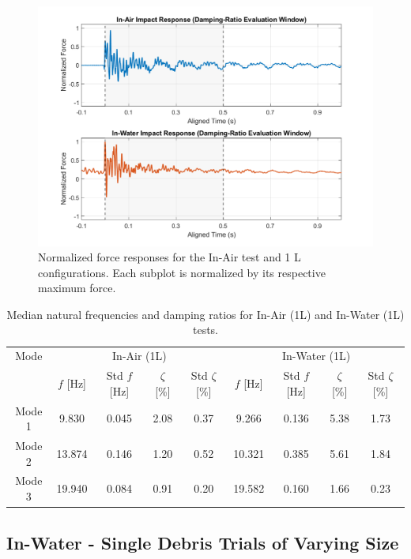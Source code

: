 \documentclass{article}
\begin{document}
{\begin{figure}[ht]
    \centering
    \includegraphics[width=\linewidth]{figures/plot_normalized_forces_in_air_vs_in_water_overlay.png}
    \caption{Normalized force responses for the In-Air test and 1 L configurations. Each subplot is normalized by its respective maximum force.}
    \label{fig:normalized_forces_structure}
\end{figure}


\begin{table}[ht]
\centering
\small
\begin{tabular}{c c c c c c c c c}
\hline
Mode & \multicolumn{4}{c}{In-Air (1L)} & \multicolumn{4}{c}{In-Water (1L)} \\
\cline{2-9}
 & $f$ [Hz] & Std $f$ [Hz] & $\zeta$ [\%] & Std $\zeta$ [\%] & $f$ [Hz] & Std $f$ [Hz] & $\zeta$ [\%] & Std $\zeta$ [\%] \\
\hline
Mode 1 & 9.830 & 0.045 & 2.08 & 0.37 & 9.266 & 0.136 & 5.38 & 1.73 \\
Mode 2 & 13.874 & 0.146 & 1.20 & 0.52 & 10.321 & 0.385 & 5.61 & 1.84 \\
Mode 3 & 19.940 & 0.084 & 0.91 & 0.20 & 19.582 & 0.160 & 1.66 & 0.23 \\
\hline
\end{tabular}

\caption{Median natural frequencies and damping ratios for In-Air (1L) and In-Water (1L) tests.}
\label{tab:mode_summary}
\end{table}


\subsection{In-Water - Single Debris Trials of Varying Size} 

}
\end{document}
